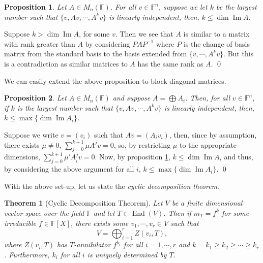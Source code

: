 \documentclass[
]{article}
\newtheorem{theorem}{Theorem}
\newtheorem{prop}{Proposition}[section]
\theoremstyle{definition}
\begin{document}
\begin{prop}\label{max_cyclic}
  Let \(A \in M_n (\mathbb{F})\). For all \(v \in \mathbb{F}^n\), suppose we 
  let \(k\) be the largest number such that \(\{v, Av, \cdots, A^kv\}\) is 
  linearly independent, then, \(k \le \dim \mathop{\mathrm{Im}}A\).
\end{prop}
\proof

Suppose \(k > \dim \mathop{\mathrm{Im}}A\), for some \(v\). Then we see
that \(A\) is similar to a matrix with rank greater than \(A\) by
considering \(PAP^{-1}\) where \(P\) is the change of basis matrix from
the standard basis to the basis extended from \(\{v, \cdots, A^kv\}\).
But this is a contradiction as similar matrices to \(A\) has the same
rank as \(A\). \qed

We can easily extend the above proposition to block diagonal matrices.

\begin{prop}
  Let \(A \in M_n (\mathbb{F})\) and suppose \(A = \bigoplus A_i\). 
  Then, for all \(v \in \mathbb{F}^n\), if \(k\) is the largest number such that 
  \(\{v, Av, \cdots, A^kv\}\) is linearly independent, then, 
  \(k \le \max \{\dim \mathop{\mathrm{Im}}A_i\}\).
\end{prop}
\proof

Suppose we write \(v = (v_i)\) such that \(Av = (A_i v_i)\), then, since
by assumption, there exists \(\mu \neq 0\),
\(\sum_{j = 0}^{k + 1} \mu A^j v = 0\), so, by restricting \(\mu\) to
the appropriate dimensions, \(\sum_{j = 0}^{k + 1} \mu' A_i^j v = 0\).
Now, by proposition \ref{max_cyclic},
\(k \le \dim \mathop{\mathrm{Im}}A_i\) and thus, by considering the
above argument for all \(i\),
\(k \le \max \{\dim \mathop{\mathrm{Im}}A_i\}\). \qed

With the above set-up, let us state the \emph{cyclic decomposition
theorem}.

\begin{theorem}[Cyclic Decomposition Theorem]\label{cyclic_dcomp}
  Let \(V\) be a finite dimensional vector space over the field \(\mathbb{F}\) 
  and let \(T \in \mathop{\mathrm{End}}(V)\). Then if \(m_T = f^k\) for some irreducible 
  \(f \in \mathbb{F}[X]\), there exists some \(v_1, \cdots, v_r \in V\) such 
  that 
  \[V = \bigoplus_{i = 1}^r Z(v_i, T),\]
  where \(Z(v_i, T)\) has \(T\)-annihilator \(f^{k_i}\) for all \(i = 1, \cdots, r\) 
  and \(k = k_1 \ge k_2 \ge \cdots \ge k_r\). Furthermore, \(k_i\) for all \(i\) is 
  uniquely determined by \(T\).
\end{theorem}
\end{document}
